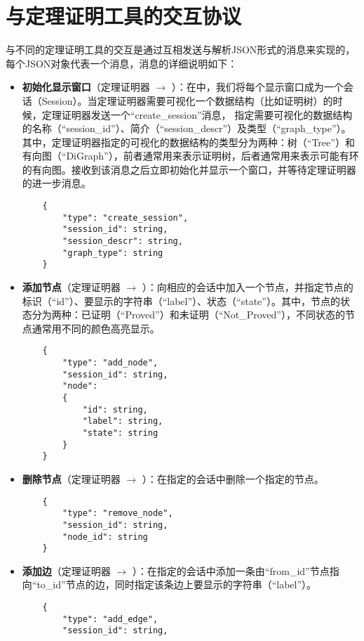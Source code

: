 \chapter{与定理证明工具的交互协议}\label{vmdv:json:protocol}
与不同的定理证明工具的交互是通过互相发送与解析JSON形式的消息来实现的，每个JSON对象代表一个消息，消息的详细说明如下：
\begin{itemize}
	\item \textbf{初始化显示窗口}（{定理证明器} $\longrightarrow$ ）：在中，我们将每个显示窗口成为一个会话（Session）。当定理证明器需要可视化一个数据结构（比如证明树）的时候，定理证明器发送一个“create\_session”消息， 指定需要可视化的数据结构的名称（“session\_id”）、简介（“session\_descr”）及类型（“graph\_type”）。其中，定理证明器指定的可视化的数据结构的类型分为两种：树（“Tree”）和有向图（“DiGraph”），前者通常用来表示证明树，后者通常用来表示可能有环的有向图。接收到该消息之后立即初始化并显示一个窗口，并等待定理证明器的进一步消息。
	\begin{verbatim}
	{
	    "type": "create_session",
	    "session_id": string,
	    "session_descr": string,
	    "graph_type": string
	}
	\end{verbatim}
	\item \textbf{添加节点}（定理证明器 $\longrightarrow$ ）：向相应的会话中加入一个节点，并指定节点的标识（“id”）、要显示的字符串（“label”）、状态（“state”）。其中，节点的状态分为两种：已证明（“Proved”）和未证明（“Not\_Proved”），不同状态的节点通常用不同的颜色高亮显示。
	\begin{verbatim}
	{
	    "type": "add_node",
	    "session_id": string,
	    "node":
	    {
	        "id": string,
	        "label": string,
	        "state": string
	    }
	}
	\end{verbatim}
	\item \textbf{删除节点}（定理证明器 $\longrightarrow$ ）：在指定的会话中删除一个指定的节点。
	\begin{verbatim}
	{
	    "type": "remove_node",
	    "session_id": string,
	    "node_id": string
	}
	\end{verbatim}
	\item \textbf{添加边}（定理证明器 $\longrightarrow$ ）：在指定的会话中添加一条由“from\_id”节点指向“to\_id”节点的边，同时指定该条边上要显示的字符串（“label”）。
	\begin{verbatim}
	{
	    "type": "add_edge",
	    "session_id": string,

\end{verbatim}
\end{itemize}
